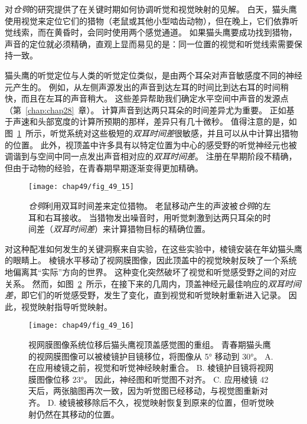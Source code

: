 对\textit{仓鸮}的研究提供了在关键时期如何协调听觉和视觉映射的见解。
白天，猫头鹰使用视觉来定位它们的猎物（老鼠或其他小型啮齿动物），但在晚上，它们依靠听觉线索，而在黄昏时，会同时使用两个感觉通道。
如果猫头鹰要成功找到猎物，声音的定位就必须精确，直观上显而易见的是：同一位置的视觉和听觉线索需要保持一致。


猫头鹰的听觉定位与人类的听觉定位类似，是由两个耳朵对声音敏感度不同的神经元产生的。
例如，从左侧声源发出的声音到达左耳的时间比到达右耳的时间稍快，而且在左耳的声音稍大。
这些差异帮助我们确定水平空间中声音的发源点（第~\ref{chap:chap28}~章）。
计算声音到达两只耳朵的时间差异尤为重要。
正如基于声速和头部宽度的计算所预期的那样，差异只有几十微秒。
值得注意的是，如图~\ref{fig:49_15}~所示，听觉系统对这些极短的\textit{双耳时间差}很敏感，并且可以从中计算出猎物的位置。
此外，视顶盖中许多具有以特定位置为中心的感受野的听觉神经元也被调谐到与空间中同一点发出声音相对应的\textit{双耳时间差}。
注册在早期阶段不精确，但由于动物的经验，在青春期早期逐渐变得更加精确。


\begin{figure}[htbp]
	\centering
	\texttt{[image: chap49/fig\_49\_15]}
	\caption{\textit{仓鸮}利用双耳时间差来定位猎物。
		老鼠移动产生的声波被\textit{仓鸮}的左耳和右耳接收。
		当猎物发出噪音时，用听觉刺激到达两只耳朵的时间差（\textit{双耳时间差}）来计算猎物目标的精确位置。}
	\label{fig:49_15}
\end{figure}


对这种配准如何发生的关键洞察来自实验，在这些实验中，棱镜安装在年幼猫头鹰的眼睛上。
棱镜水平移动了视网膜图像，因此顶盖中的视觉映射反映了一个系统地偏离其“实际”方向的世界。
这种变化突然破坏了视觉和听觉感受野之间的对应关系。 
然而，如图~\ref{fig:49_16}~所示，在接下来的几周内，顶盖神经元最佳响应的\textit{双耳时间差}，即它们的听觉感受野，发生了变化，直到视觉和听觉映射重新进入记录。 
因此，视觉映射指导听觉映射。


\begin{figure}[htbp]
	\centering
	\texttt{[image: chap49/fig\_49\_16]}
	\caption{视网膜图像系统位移后猫头鹰视顶盖感觉图的重组。
		青春期猫头鹰的视网膜图像可以被棱镜护目镜移位，将图像从 5° 移动到 30°\cite{knudsen2002instructed}。
		A. 在应用棱镜之前，视觉和听觉神经映射重合。
		B. 棱镜护目镜将视网膜图像位移 23°。
		因此，神经图和听觉图不对齐。
		C. 应用棱镜 42 天后，两张脑图再次一致，因为听觉图已经移动，与视觉图重新对齐。
		D. 棱镜被移除后不久，视觉映射恢复到原来的位置，但听觉映射仍然在其移动的位置。}
	\label{fig:49_16}
\end{figure}

